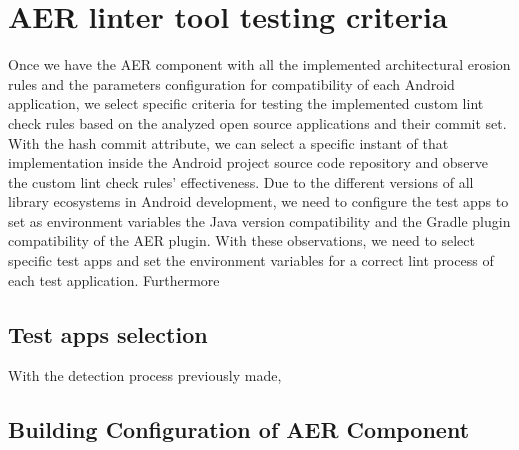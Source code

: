 \section{AER linter tool testing criteria}
Once we have the AER component with all the implemented architectural erosion rules and the parameters configuration for compatibility of each Android application, we select specific criteria for testing the implemented custom lint check rules based on the analyzed open source applications and their commit set. With the hash commit attribute, we can select a specific instant of that implementation inside the Android project source code repository and observe the custom lint check rules' effectiveness. Due to the different versions of all library ecosystems in Android development, we need to configure the test apps to set as environment variables the Java version compatibility and the Gradle plugin compatibility of the AER plugin. With these observations, we need to select specific test apps and set the environment variables for a correct lint process of each test application.
Furthermore

\subsection{Test apps selection}
With the detection process previously made,

\subsection{Building Configuration of AER Component}
